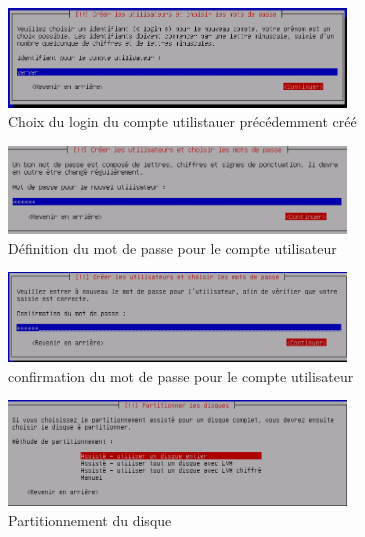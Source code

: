 \documentclass[11pt,a4paper,titlepage, oneside]{article}
\begin{document}
	 \newpage
                \begin{figure}[h]
                        \centering
                        \includegraphics[width=0.8\textwidth,natwidth=610,natheight=642]{images/debian9.png}
                        \caption{Choix du login du compte utilistauer précédemment créé}
                \end{figure}

	 \newpage
                \begin{figure}[h]
                        \centering
                        \includegraphics[width=0.8\textwidth,natwidth=610,natheight=642]{images/debian10.png}
                        \caption{Définition du mot de passe pour le compte utilisateur}
                \end{figure}

	
	\newpage
                \begin{figure}[h]
                        \centering
                        \includegraphics[width=0.8\textwidth,natwidth=610,natheight=642]{images/debian11.png}
                        \caption{confirmation du mot de passe pour le compte utilisateur}
                \end{figure}

	 \newpage
                \begin{figure}[h]
                        \centering
                        \includegraphics[width=0.8\textwidth,natwidth=610,natheight=642]{images/debian12.png}
                        \caption{Partitionnement du disque}
                \end{figure}
\end{document}
